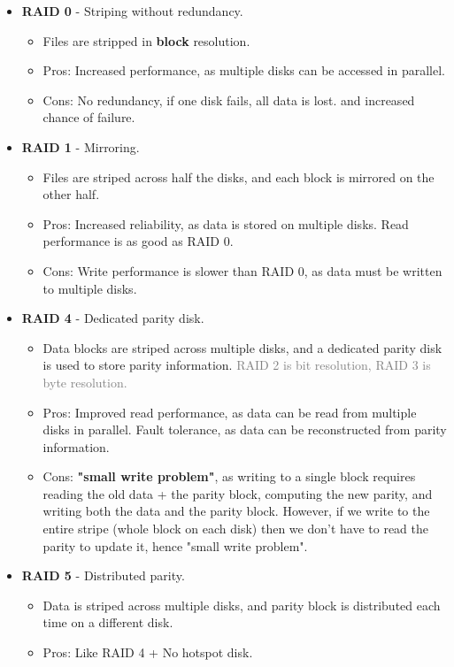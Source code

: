 \documentclass[openany,12pt]{book}
\newcommand{\gray}[1]{\textcolor{gray}{#1}}
\begin{document}
\begin{itemize}
  \item \textbf{RAID 0} - Striping without redundancy.\\
  \begin{itemize}
    \item   Files are stripped in \textbf{block} resolution.
    \item   Pros: Increased performance, as multiple disks can be accessed in parallel.
    \item   Cons: No redundancy, if one disk fails, all data is lost. and increased chance of failure.
  \end{itemize}

  \item \textbf{RAID 1} - Mirroring.\\
  \begin{itemize}
    \item Files are striped across half the disks, and each block is mirrored on the other half. 
    \item Pros: Increased reliability, as data is stored on multiple disks. Read performance is as good as RAID 0.
    \item Cons: Write performance is slower than RAID 0, as data must be written to multiple disks.
  \end{itemize}

  \item \textbf{RAID 4} - Dedicated parity disk.\\
  \begin{itemize}
    \item Data blocks are striped across multiple disks, and a dedicated parity disk is used to store parity information. \gray{RAID 2 is bit resolution, RAID 3 is byte resolution.}
    \item Pros: Improved read performance, as data can be read from multiple disks in parallel. Fault tolerance, as data can be reconstructed from parity information.
    \item Cons: \textbf{"small write problem"}, as writing to a single block requires reading the old data + the parity block, computing the new parity, and writing both the data and the parity block. However, if we write to the entire stripe (whole block on each disk) then we don't have to read the parity to update it, hence "small write problem".
  \end{itemize}

  \item \textbf{RAID 5} - Distributed parity.\\
  \begin{itemize}
    \item Data is striped across multiple disks, and parity block is distributed each time on a different disk.
    \item Pros: Like RAID 4 + No hotspot disk.
  \end{itemize}


\end{itemize}
\end{document}
